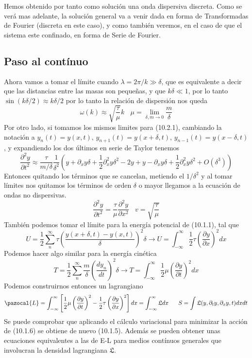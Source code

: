 Hemos obtenido por tanto como solución una onda dispersiva discreta. Como se verá mas adelante, la solución general va a venir dada en forma de Transformadas de Fourier (discreta en este caso), y como también veremos, en el caso de que el sistema este confinado, en forma de Serie de Fourier.

\newpage
\subsection{Paso al contínuo}
Ahora vamos a tomar el límite cuando $\lambda = 2\pi / k \gg \delta$, que es equivalente a decir que las distancias entre las masas son pequeñas, y que $k\delta \ll 1$, por lo tanto $\sin{\left(k \delta/2\right)} \approx k \delta/2$ por lo tanto la relación de dispersión nos queda 
\begin{equation} \label{6.1.1}
    \omega (k) \approx  \sqrt{\frac{\tau}{\mu}} k \ \ \ \ \mu = \lim_{\delta,m \rightarrow 0} \frac{m}{\delta}
\end{equation}
Por otro lado, si tomamos los mismos limites para (10.2.1), cambiando la notación a $y_{n} (t) = y(x,t)$, $y_{n+1}(t) = y(x+\delta,t)$, $y_{n-1}(t) = y(x-\delta,t)$, y expandiendo los dos últimos en serie de Taylor tenemos
\[\frac{\partial^2 y}{\partial t^2} \approx \frac{\tau}{m/\delta} \frac{1}{\delta^2}\left(y+\partial_x y\delta + \frac{1}{2}\partial^2_xy \delta^2-2y+y-\partial_x y \delta + \frac{1}{2}\partial^2_x y \delta^2+ O(\delta^3)\right)\]
Entonces quitando los términos que se cancelan, metiendo el $1/\delta^2$ y al tomar límites nos quitamos los términos de orden $\delta$ o mayor llegamos a la ecuación de ondas no dispersivas.
\begin{equation} \label{6.1.1}
    \frac{\partial^2 y}{\partial t^2} = \frac{\tau}{\mu} \frac{\partial^2 y}{\partial x^2} \ \ \ \ v = \sqrt{\frac{\tau}{\mu}}
\end{equation}
También podemos tomar el límite para la energía potencial de (10.1.1), tal que
\[ U = \frac{1}{2} \sum_n^\infty \tau \left(\frac{y(x+\delta,t)-y(x,t)}{\delta}\right)^2 \delta \rightarrow U = \int_{-\infty}^\infty \frac{1}{2} \tau \left(\frac{\partial y}{\partial x}\right)^2 dx\]
Podemos hacer algo similar para la energía cinética
\[ T = \frac{1}{2} \sum_n^\infty \frac{m}{\delta} \left(\frac{d y_n}{dt}\right)^2 \delta \rightarrow T = \int_{-\infty}^\infty \frac{1}{2} \mu \left(\frac{\partial y}{\partial t}\right)^2 dx\]
Podemos construirnos entonces un lagrangiano
\begin{equation} \label{6.1.1}
    \pazocal{L} = \int_{-\infty}^\infty \left[\frac{1}{2} \mu \left(\frac{\partial y}{\partial t}\right)^2 -\frac{1}{2} \tau \left(\frac{\partial y}{\partial x}\right)^2\right] dx= \int_{-\infty}^\infty \mathfrak{L}dx \ \ \ \ \ S = \int \mathfrak{L}(y,\partial_t y,\partial_x y,t) dxdt
\end{equation}
Se puede comprobar que aplicando el cálculo variacional para minimizar la acción de (10.1.6) se obtiene de nuevo (10.1.5). Además se pueden obtener unas ecuaciones equivalentes a las de E-L para medios contínuos generales que involucran la densidad lagrangiana $\mathfrak{L}$.

